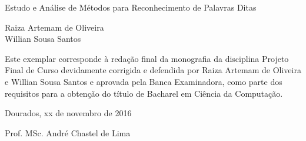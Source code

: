 \thispagestyle{empty}
\begin{center}

\Large{Estudo e Análise de Métodos para Reconhecimento de Palavras Ditas}

\vspace*{4cm}

\large{Raiza Artemam de Oliveira \\ Willian Sousa Santos }

\vspace*{4cm}

\end{center}
\begin{flushright}
\begin{minipage}{0.5\textwidth}
\normalsize{
Este exemplar corresponde à redação final
da monografia da disciplina Projeto Final de Curso 
devidamente corrigida e defendida por
 Raiza Artemam de Oliveira e Willian Sousa Santos
e aprovada pela Banca Examinadora, 
como parte dos requisitos para a obtenção
do título de Bacharel em Ciência da Computação.

\vspace*{2cm}

Dourados, xx de novembro de 2016

\vspace*{2cm}

Prof. MSc. André Chastel de Lima
}
\end{minipage}
\end{flushright}



